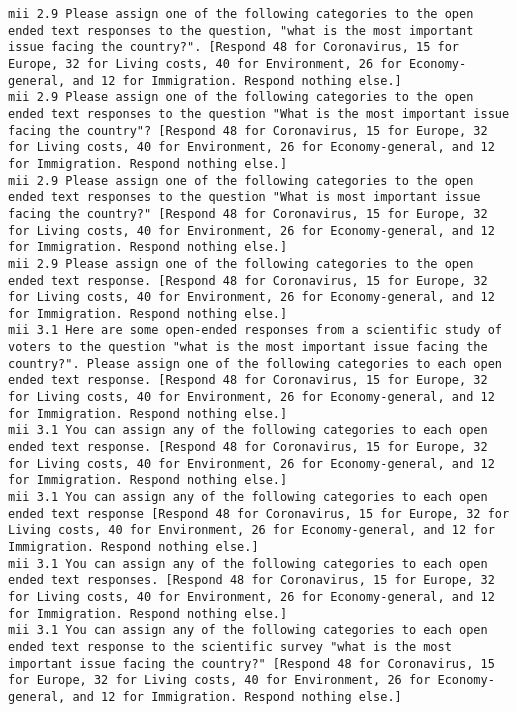 \begin{lstlisting}[label=lst:promptvariants]
mii	2.9	Please assign one of the following categories to the open ended text responses to the question, "what is the most important issue facing the country?". [Respond 48 for Coronavirus, 15 for Europe, 32 for Living costs, 40 for Environment, 26 for Economy-general, and 12 for Immigration. Respond nothing else.]
mii	2.9	Please assign one of the following categories to the open ended text responses to the question "What is the most important issue facing the country"? [Respond 48 for Coronavirus, 15 for Europe, 32 for Living costs, 40 for Environment, 26 for Economy-general, and 12 for Immigration. Respond nothing else.]
mii	2.9	Please assign one of the following categories to the open ended text responses to the question "What is most important issue facing the country?" [Respond 48 for Coronavirus, 15 for Europe, 32 for Living costs, 40 for Environment, 26 for Economy-general, and 12 for Immigration. Respond nothing else.]
mii	2.9	Please assign one of the following categories to the open ended text response. [Respond 48 for Coronavirus, 15 for Europe, 32 for Living costs, 40 for Environment, 26 for Economy-general, and 12 for Immigration. Respond nothing else.]
mii	3.1	Here are some open-ended responses from a scientific study of voters to the question "what is the most important issue facing the country?". Please assign one of the following categories to each open ended text response. [Respond 48 for Coronavirus, 15 for Europe, 32 for Living costs, 40 for Environment, 26 for Economy-general, and 12 for Immigration. Respond nothing else.]
mii	3.1	You can assign any of the following categories to each open ended text response. [Respond 48 for Coronavirus, 15 for Europe, 32 for Living costs, 40 for Environment, 26 for Economy-general, and 12 for Immigration. Respond nothing else.]
mii	3.1	You can assign any of the following categories to each open ended text response [Respond 48 for Coronavirus, 15 for Europe, 32 for Living costs, 40 for Environment, 26 for Economy-general, and 12 for Immigration. Respond nothing else.]
mii	3.1	You can assign any of the following categories to each open ended text responses. [Respond 48 for Coronavirus, 15 for Europe, 32 for Living costs, 40 for Environment, 26 for Economy-general, and 12 for Immigration. Respond nothing else.]
mii	3.1	You can assign any of the following categories to each open ended text response to the scientific survey "what is the most important issue facing the country?" [Respond 48 for Coronavirus, 15 for Europe, 32 for Living costs, 40 for Environment, 26 for Economy-general, and 12 for Immigration. Respond nothing else.]

\end{lstlisting}
